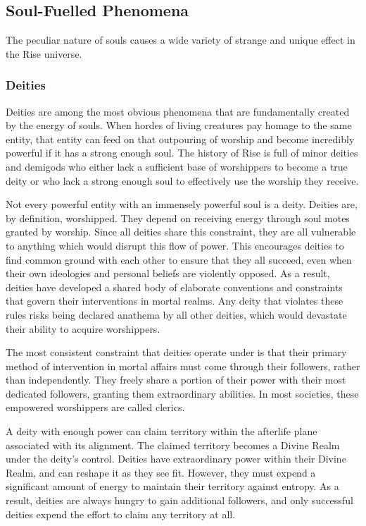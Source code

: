     \subsection{Soul-Fuelled Phenomena}

        The peculiar nature of souls causes a wide variety of strange and unique effect in the Rise universe.

        \subsubsection{Deities}
            Deities are among the most obvious phenomena that are fundamentally created by the energy of souls.
            When hordes of living creatures pay homage to the same entity, that entity can feed on that outpouring of worship and become incredibly powerful if it has a strong enough soul.
            The history of Rise is full of minor deities and demigods who either lack a sufficient base of worshippers to become a true deity or who lack a strong enough soul to effectively use the worship they receive.

            Not every powerful entity with an immensely powerful soul is a deity.
            Deities are, by definition, worshipped.
            They depend on receiving energy through soul motes granted by worship.
            Since all deities share this constraint, they are all vulnerable to anything which would disrupt this flow of power.
            This encourages deities to find common ground with each other to ensure that they all succeed, even when their own ideologies and personal beliefs are violently opposed.
            As a result, deities have developed a shared body of elaborate conventions and constraints that govern their interventions in mortal realms.
            Any deity that violates these rules risks being declared anathema by all other deities, which would devastate their ability to acquire worshippers.

            The most consistent constraint that deities operate under is that their primary method of intervention in mortal affairs must come through their followers, rather than independently.
            They freely share a portion of their power with their most dedicated followers, granting them extraordinary abilities.
            In most societies, these empowered worshippers are called clerics.

            A deity with enough power can claim territory within the afterlife plane associated with its alignment.
            The claimed territory becomes a Divine Realm under the deity's control.
            Deities have extraordinary power within their Divine Realm, and can reshape it as they see fit.
            However, they must expend a significant amount of energy to maintain their territory against entropy.
            As a result, deities are always hungry to gain additional followers, and only successful deities expend the effort to claim any territory at all.

